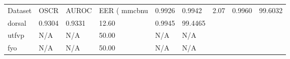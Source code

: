 \begin{tabular}{llllll}
\toprule
Dataset & OSCR & AUROC & EER (%
\midrule
mmcbnu & 0.9926 & 0.9942 & 2.07 & 0.9960 & 99.6032 \\
dorsal & 0.9304 & 0.9331 & 12.60 & 0.9945 & 99.4465 \\
utfvp & N/A & N/A & 50.00 & N/A & N/A \\
fyo & N/A & N/A & 50.00 & N/A & N/A \\
\bottomrule
\end{tabular}

